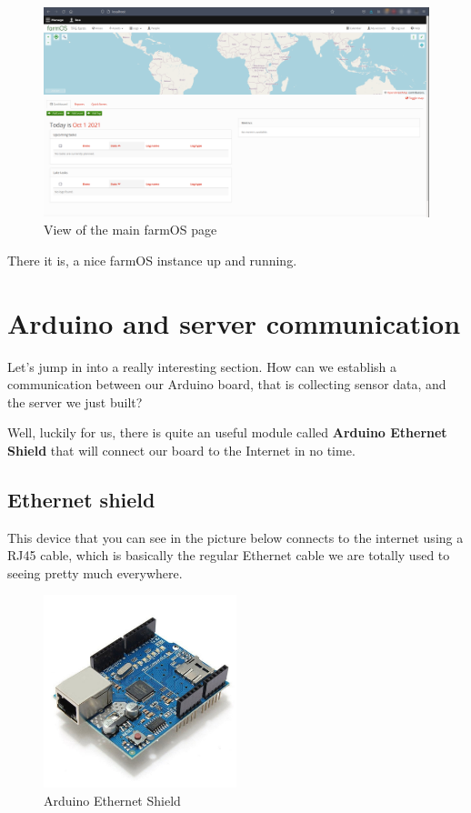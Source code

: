 \begin{figure}[H]
    \centering
    \includegraphics[width=1\textwidth]{fig/drupal-install/farmos-main-page.png}
    \caption{View of the main farmOS page}
    \label{fig:farmos-main-page}
\end{figure}

There it is, a nice farmOS instance up and running.


\vspace{7mm}
\section{Arduino and server communication}
Let's jump in into a really interesting section. How can we establish a communication between our Arduino board, that is collecting sensor data, and the server we just built?

Well, luckily for us, there is quite an useful module called \textbf{Arduino Ethernet Shield} that will connect our board to the Internet in no time.

\subsection{Ethernet shield}
This device that you can see in the picture below connects to the internet using a RJ45 cable, which is basically the regular Ethernet cable we are totally used to seeing pretty much everywhere.

\begin{figure}[H]
    \centering
    \includegraphics[width=0.5\textwidth]{fig/ethernet.jpg}
    \caption{Arduino Ethernet Shield}
    \label{fig:ethernet}
\end{figure}

